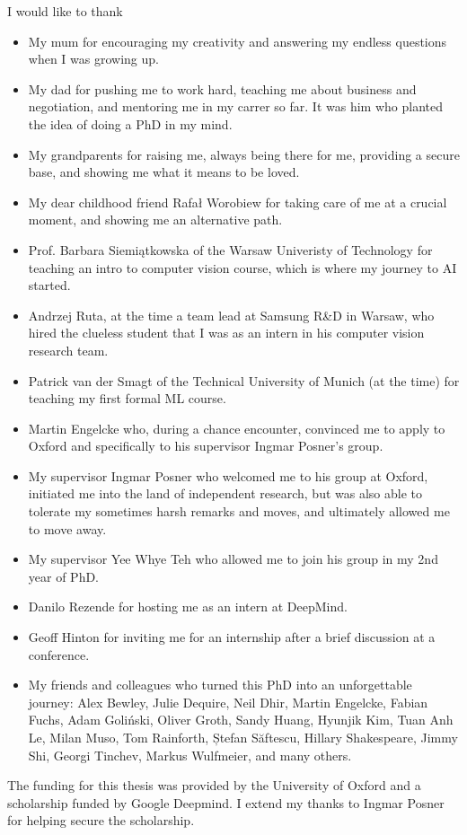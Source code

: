 I would like to thank

\begin{itemize}
	\item My mum for encouraging my creativity and answering my endless questions when I was growing up.
	\item  My dad for pushing me to work hard, teaching me about business and negotiation, and mentoring me in my carrer so far. It was him who planted the idea of doing a PhD in my mind.
	\item My grandparents for raising me, always being there for me, providing a secure base, and showing me what it means to be loved.
	\item My dear childhood friend Rafał Worobiew for taking care of me at a crucial moment, and showing me an alternative path.
	\item Prof. Barbara Siemiątkowska of the Warsaw Univeristy of Technology for teaching an intro to computer vision course, which is where my journey to AI started.
	\item Andrzej Ruta, at the time a team lead at Samsung R\&D in Warsaw, who hired the clueless student that I was as an intern in his computer vision research team.
	\item Patrick van der Smagt of the Technical University of Munich (at the time) for teaching my first formal ML course. 
	\item Martin Engelcke who, during a chance encounter, convinced me to apply to Oxford and specifically to his supervisor Ingmar Posner's group.
	\item My supervisor Ingmar Posner who welcomed me to his group at Oxford, initiated me into the land of independent research, but was also able to tolerate my sometimes harsh remarks and moves, and ultimately allowed me to move away.
	\item My supervisor Yee Whye Teh who allowed me to join his group in my 2nd year of PhD.
	\item Danilo Rezende for hosting me as an intern at DeepMind.
	\item Geoff Hinton for inviting me for an internship after a brief discussion at a conference.
	\item My friends and colleagues who turned this PhD into an unforgettable journey: Alex Bewley, Julie Dequire, Neil Dhir, Martin Engelcke, Fabian Fuchs, Adam Goliński, Oliver Groth, Sandy Huang, Hyunjik Kim, Tuan Anh Le, Milan Muso, Tom Rainforth, Ștefan Săftescu, Hillary Shakespeare, Jimmy Shi, Georgi Tinchev, Markus Wulfmeier, and many others.
\end{itemize}

The funding for this thesis was provided by the University of Oxford and a scholarship funded by Google Deepmind. I extend my thanks to Ingmar Posner for helping secure the scholarship.